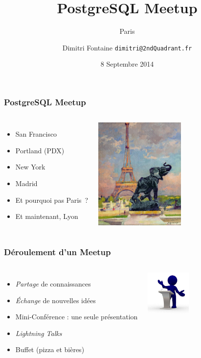 \documentclass{beamer}
\title{PostgreSQL Meetup}
\subtitle{Paris}
\author{Dimitri Fontaine \texttt{dimitri@2ndQuadrant.fr}}
\date{8 Septembre 2014}
\begin{document}
\frame{\titlepage}

\begin{frame}[fragile]
  \frametitle{PostgreSQL Meetup}

  \vfill

\begin{columns}

  \begin{itemize}
  \item San Francisco
  \item Portland (PDX)
  \item New York
  \item Madrid
  \item Et pourquoi pas Paris ?
  \item Et maintenant, Lyon
  \end{itemize}

\begin{center}
  \includegraphics[height=15em]{the-eiffel-tower-and-the-elephant-by-fremiet-jules-ernest-renoux.jpg}
\end{center}
\end{columns}
\end{frame}

\begin{frame}[fragile]
  \frametitle{Déroulement d'un Meetup}

  \vfill

\begin{columns}

\begin{itemize}
\item \textit{Partage} de connaissances
\item \textit{Échange} de nouvelles idées
\item Mini-Conférence : une seule présentation
\item \textit{Lightning Talks}
\item Buffet (pizza et bières)
\end{itemize}

\begin{center}
  \includegraphics[height=6em]{conferences.jpg}
\end{center}
\end{columns}
\end{frame}
\end{document}
